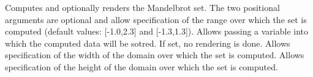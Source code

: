 Computes and optionally renders the Mandelbrot set.
The two positional arguments are optional and allow specification of the
range over which the set is computed (default values: 
[-1.0,2.3] and [-1.3,1.3]).
Allows passing a variable into which the computed data will be sotred.
If set, no rendering is done.
Allows specification of the width of the domain over which the set is computed.
Allows specification of the height of the domain over which the set is computed.
